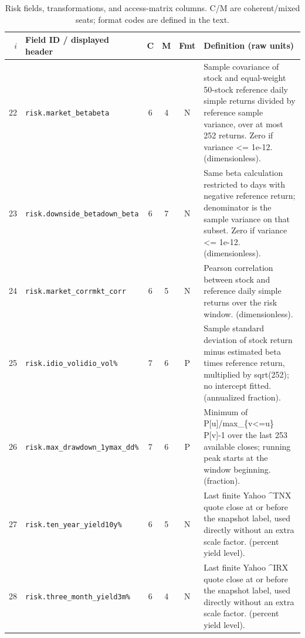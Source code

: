 \begin{table}[t]
\caption{Risk fields, transformations, and access-matrix columns. C/M are coherent/mixed seats; format codes are defined in the text.}
\label{tab:repro-risk}
\small
\begin{tabular}{@{}rp{}cccp{}@{}}
\toprule
$i$ & Field ID / displayed header & C & M & Fmt & Definition (raw units) \\
\midrule
22 & \texttt{risk.\allowbreak{}market\_\allowbreak{}beta}\newline \texttt{beta} & 6 & 4 & N & Sample covariance of stock and equal-weight 50-stock reference daily simple returns divided by reference sample variance, over at most 252 returns. Zero if variance <= 1e-12. (dimensionless). \\[2pt]
23 & \texttt{risk.\allowbreak{}downside\_\allowbreak{}beta}\newline \texttt{down\_\allowbreak{}beta} & 6 & 7 & N & Same beta calculation restricted to days with negative reference return; denominator is the sample variance on that subset. Zero if variance <= 1e-12. (dimensionless). \\[2pt]
24 & \texttt{risk.\allowbreak{}market\_\allowbreak{}corr}\newline \texttt{mkt\_\allowbreak{}corr} & 6 & 5 & N & Pearson correlation between stock and reference daily simple returns over the risk window. (dimensionless). \\[2pt]
25 & \texttt{risk.\allowbreak{}idio\_\allowbreak{}vol}\newline \texttt{idio\_\allowbreak{}vol\%} & 7 & 6 & P & Sample standard deviation of stock return minus estimated beta times reference return, multiplied by sqrt(252); no intercept fitted. (annualized fraction). \\[2pt]
26 & \texttt{risk.\allowbreak{}max\_\allowbreak{}drawdown\_\allowbreak{}1y}\newline \texttt{max\_\allowbreak{}dd\%} & 7 & 6 & P & Minimum of P[u]/max\_\{v<=u\} P[v]-1 over the last 253 available closes; running peak starts at the window beginning. (fraction). \\[2pt]
27 & \texttt{risk.\allowbreak{}ten\_\allowbreak{}year\_\allowbreak{}yield}\newline \texttt{10y\%} & 6 & 5 & N & Last finite Yahoo \textasciicircum{}TNX quote close at or before the snapshot label, used directly without an extra scale factor. (percent yield level). \\[2pt]
28 & \texttt{risk.\allowbreak{}three\_\allowbreak{}month\_\allowbreak{}yield}\newline \texttt{3m\%} & 6 & 4 & N & Last finite Yahoo \textasciicircum{}IRX quote close at or before the snapshot label, used directly without an extra scale factor. (percent yield level). \\[2pt]

\end{tabular}
\end{table}
